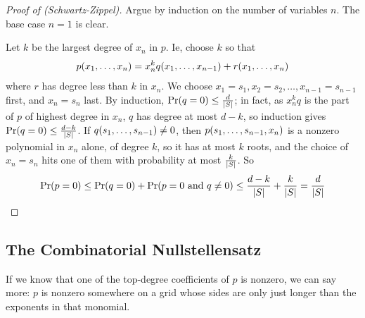 \begin{proof}[Proof of  (Schwartz-Zippel)]
    Argue by induction on the number of variables $n$. The base case $n = 1$ is clear.

    Let $k$ be the largest degree of $x_n$ in $p$. Ie, choose $k$ so that
    \begin{align*}
        p\!\left( x_1, \ldots, x_n \right) = x_n^k q\!\left( x_1, \ldots, x_{n - 1} \right) + r\!\left( x_1, \ldots, x_n \right)
    \end{align*}
    where $r$ has degree less than $k$ in $x_n$.
    We choose $x_1 = s_1, x_2 = s_2, \ldots, x_{n - 1} = s_{n - 1}$ first, and $x_n = s_n$ last. By induction, $\Pr\!\left( q = 0 \right) \leq \frac{d}{\left\lvert S \right\rvert}$; in fact, as $x_n^k q$ is the part of $p$ of highest degree in $x_n$, $q$ has degree at most $d - k$, so induction gives $\Pr\!\left( q = 0 \right) \leq \frac{d - k}{\left\lvert S \right\rvert}$. If $q\!\left( s_1, \ldots, s_{n-1} \right) \neq 0$, then $p\!\left( s_1, \ldots, s_{n-1}, x_n \right)$ is a nonzero polynomial in $x_n$ alone, of degree $k$, so it has at most $k$ roots, and the choice of $x_n = s_n$ hits one of them with probability at most $\frac{k}{\left\lvert S \right\rvert}$. So
    \begin{align*}
        \Pr\!\left( p = 0 \right) \leq \Pr\!\left( q = 0 \right) + \Pr\!\left( p = 0 \text{ and } q \neq 0 \right) \leq \frac{d - k}{\left\lvert S \right\rvert} + \frac{k}{\left\lvert S \right\rvert} = \frac{d}{\left\lvert S \right\rvert}
    \end{align*}
\end{proof}

\subsection{The Combinatorial Nullstellensatz}

If we know that one of the top-degree coefficients of $p$ is nonzero, we can say more: $p$ is nonzero somewhere on a grid whose sides are only just longer than the exponents in that monomial.

